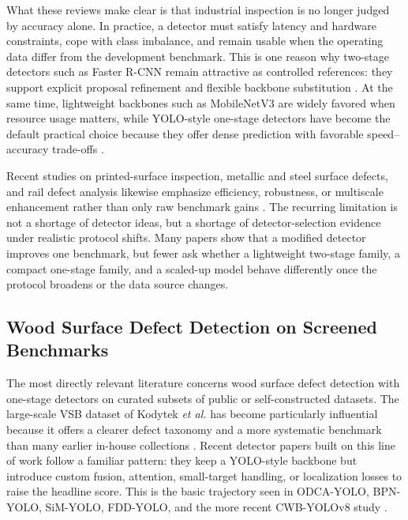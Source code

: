What these reviews make clear is that industrial inspection is no longer judged by accuracy alone. In practice, a detector must satisfy latency and hardware constraints, cope with class imbalance, and remain usable when the operating data differ from the development benchmark. This is one reason why two-stage detectors such as Faster R-CNN remain attractive as controlled references: they support explicit proposal refinement and flexible backbone substitution \citep{faster_rcnn}. At the same time, lightweight backbones such as MobileNetV3 are widely favored when resource usage matters, while YOLO-style one-stage detectors have become the default practical choice because they offer dense prediction with favorable speed--accuracy trade-offs \citep{mobilenetv3,mittal_2024}.

Recent studies on printed-surface inspection, metallic and steel surface defects, and rail defect analysis likewise emphasize efficiency, robustness, or multiscale enhancement rather than only raw benchmark gains \citep{cmc_printed_positive,cmc_channel_shuffle,cmc_lmvit,cmc_msese,cmc_rail_upernet}. The recurring limitation is not a shortage of detector ideas, but a shortage of detector-selection evidence under realistic protocol shifts. Many papers show that a modified detector improves one benchmark, but fewer ask whether a lightweight two-stage family, a compact one-stage family, and a scaled-up model behave differently once the protocol broadens or the data source changes.

\subsection{Wood Surface Defect Detection on Screened Benchmarks}

The most directly relevant literature concerns wood surface defect detection with one-stage detectors on curated subsets of public or self-constructed datasets. The large-scale VSB dataset of Kodytek \textit{et al.} has become particularly influential because it offers a clearer defect taxonomy and a more systematic benchmark than many earlier in-house collections \citep{kodytek_dataset}. Recent detector papers built on this line of work follow a familiar pattern: they keep a YOLO-style backbone but introduce custom fusion, attention, small-target handling, or localization losses to raise the headline score. This is the basic trajectory seen in ODCA-YOLO, BPN-YOLO, SiM-YOLO, FDD-YOLO, and the more recent CWB-YOLOv8 study \citep{odca_yolo,bpn_yolo,sim_yolo,fdd_yolo,an_cwb_yolov8}.

